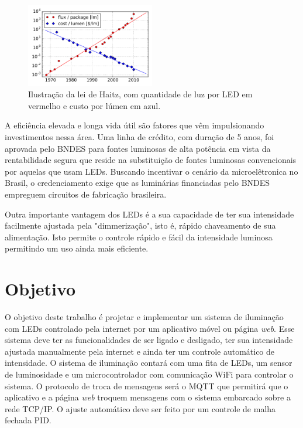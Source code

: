 \begin{figure}[ht]
    \begin{center}
    \includegraphics[width=0.5\textwidth]{figuras/haitz.png}
    \end{center}
    \caption{Ilustração da lei de Haitz, com quantidade de luz por LED em vermelho e custo por lúmen em azul.}
    \label{fig:haitz}
\end{figure}

A eficiência elevada e longa vida útil são fatores que vêm impulsionando investimentos nessa área. Uma linha de crédito, com duração de 5 anos, foi aprovada pelo BNDES \cite{bndes2} para fontes luminosas de alta potência em vista da rentabilidade segura que reside na substituição de fontes luminosas convencionais por aquelas que usam LEDs. Buscando incentivar o cenário da microelêtronica no Brasil, o credenciamento exige que as luminárias financiadas pelo BNDES empreguem circuitos de fabricação brasileira.

Outra importante vantagem dos LEDs é a sua capacidade de ter sua intensidade facilmente ajustada pela "dimmerização", isto é, rápido chaveamento de sua alimentação. Isto permite o controle rápido e fácil da intensidade luminosa permitindo um uso ainda mais eficiente.

\section{Objetivo}

O objetivo deste trabalho é projetar e implementar um sistema de iluminação com LEDs controlado pela internet por um aplicativo móvel ou página \textit{web}. Esse sistema deve ter as funcionalidades de ser ligado e desligado, ter sua intensidade ajustada manualmente pela internet e ainda ter um controle automático de intensidade. O sistema de iluminação contará com uma fita de LEDs, um sensor de luminosidade e um microcontrolador com comunicação WiFi para controlar o sistema. O protocolo de troca de mensagens será o MQTT que permitirá que o aplicativo e a página \textit{web} troquem mensagens com o sistema embarcado sobre a rede TCP/IP. O ajuste automático deve ser feito por um controle de malha fechada PID.

